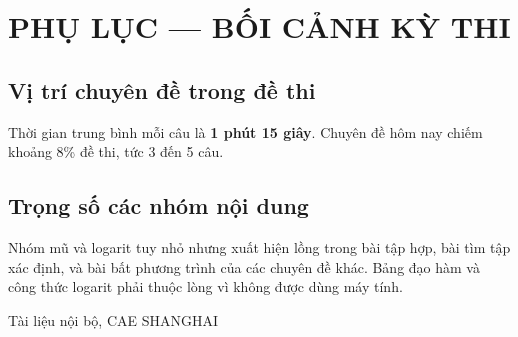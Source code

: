 \documentclass[11pt, a4paper]{article}
\begin{document}
\section{PHỤ LỤC — BỐI CẢNH KỲ THI}

\subsection{Vị trí chuyên đề trong đề thi}


Thời gian trung bình mỗi câu là \textbf{1 phút 15 giây}. Chuyên đề hôm nay chiếm khoảng 8\% đề thi, tức 3 đến 5 câu.

\subsection{Trọng số các nhóm nội dung}


Nhóm mũ và logarit tuy nhỏ nhưng xuất hiện lồng trong bài tập hợp, bài tìm tập xác định, và bài bất phương trình của các chuyên đề khác. Bảng đạo hàm và công thức logarit phải thuộc lòng vì không được dùng máy tính.
\vspace{0.8cm}
\begin{center}
{\footnotesize\color{cae_blue} Tài liệu nội bộ, CAE SHANGHAI}
\end{center}
\end{document}
